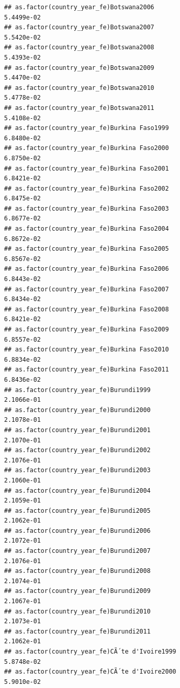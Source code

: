 \documentclass[
  a4paper,
]{article}
\begin{document}
\begin{verbatim}
## as.factor(country_year_fe)Botswana2006                          5.4499e-02
## as.factor(country_year_fe)Botswana2007                          5.5420e-02
## as.factor(country_year_fe)Botswana2008                          5.4393e-02
## as.factor(country_year_fe)Botswana2009                          5.4470e-02
## as.factor(country_year_fe)Botswana2010                          5.4778e-02
## as.factor(country_year_fe)Botswana2011                          5.4108e-02
## as.factor(country_year_fe)Burkina Faso1999                      6.8480e-02
## as.factor(country_year_fe)Burkina Faso2000                      6.8750e-02
## as.factor(country_year_fe)Burkina Faso2001                      6.8421e-02
## as.factor(country_year_fe)Burkina Faso2002                      6.8475e-02
## as.factor(country_year_fe)Burkina Faso2003                      6.8677e-02
## as.factor(country_year_fe)Burkina Faso2004                      6.8672e-02
## as.factor(country_year_fe)Burkina Faso2005                      6.8567e-02
## as.factor(country_year_fe)Burkina Faso2006                      6.8443e-02
## as.factor(country_year_fe)Burkina Faso2007                      6.8434e-02
## as.factor(country_year_fe)Burkina Faso2008                      6.8421e-02
## as.factor(country_year_fe)Burkina Faso2009                      6.8557e-02
## as.factor(country_year_fe)Burkina Faso2010                      6.8834e-02
## as.factor(country_year_fe)Burkina Faso2011                      6.8436e-02
## as.factor(country_year_fe)Burundi1999                           2.1066e-01
## as.factor(country_year_fe)Burundi2000                           2.1078e-01
## as.factor(country_year_fe)Burundi2001                           2.1070e-01
## as.factor(country_year_fe)Burundi2002                           2.1076e-01
## as.factor(country_year_fe)Burundi2003                           2.1060e-01
## as.factor(country_year_fe)Burundi2004                           2.1059e-01
## as.factor(country_year_fe)Burundi2005                           2.1062e-01
## as.factor(country_year_fe)Burundi2006                           2.1072e-01
## as.factor(country_year_fe)Burundi2007                           2.1076e-01
## as.factor(country_year_fe)Burundi2008                           2.1074e-01
## as.factor(country_year_fe)Burundi2009                           2.1067e-01
## as.factor(country_year_fe)Burundi2010                           2.1073e-01
## as.factor(country_year_fe)Burundi2011                           2.1062e-01
## as.factor(country_year_fe)CÃ´te d'Ivoire1999                    5.8748e-02
## as.factor(country_year_fe)CÃ´te d'Ivoire2000                    5.9010e-02

\end{verbatim}
\end{document}
